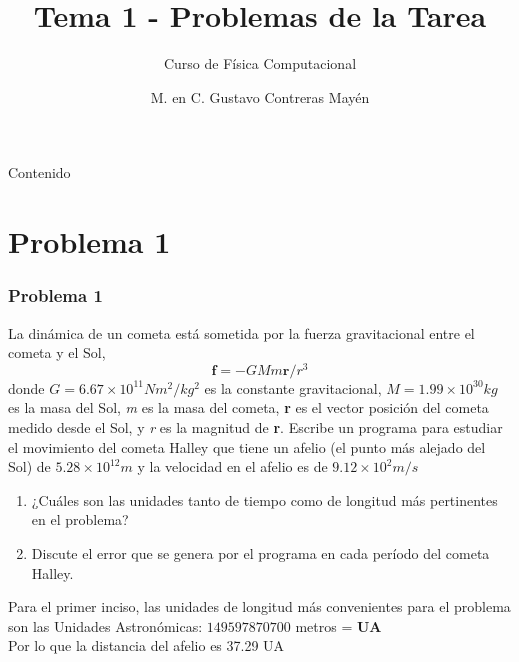 

\renewcommand {\arraystretch}{1.5}
{
}
\title{Tema 1 - Problemas de la Tarea}
\subtitle{Curso de F\'{i}sica Computacional}
\author{M. en C. Gustavo Contreras May\'{e}n}

\maketitle
\fontsize{14}{14}\selectfont
{}
\begin{frame}{Contenido}
\tableofcontents[pausesections]
\end{frame}
\section{Problema 1}
\begin{frame}
\frametitle{Problema 1}
La din\'{a}mica de un cometa est\'{a} sometida por la fuerza gravitacional entre el cometa y el Sol, 
\[   \textbf{f} = -GMm \textbf{r}/r^{3} \]
donde $ G=6.67 \times 10^{11} Nm^{2}/kg^{2}$ es la constante gravitacional, $M=1.99 \times 10^{30} kg$ es la masa del Sol, \textit{m} es la masa del cometa, \textbf{r} es el vector posici\'{o}n del cometa medido desde el Sol, y \textit{r} es la magnitud de \textbf{r}. Escribe un programa para estudiar el movimiento del cometa Halley que tiene un afelio (el punto m\'{a}s alejado del Sol) de $5.28 \times 10^{12}m$ y la velocidad en el afelio es de $9.12 \times 10^{2} m/s$
\end{frame}
\begin{frame}
\begin{enumerate}
\item ¿Cu\'{a}les son las unidades tanto de tiempo como de longitud m\'{a}s pertinentes en el problema?
\item Discute el error que se genera por el programa en cada per\'{i}odo del cometa Halley.
\end{enumerate}
\end{frame}
\begin{frame}
Para el primer inciso, las unidades de longitud m\'{a}s convenientes para el problema son las Unidades Astron\'{o}micas: $149597870700$ metros = \textbf{UA}
\\
\medskip
Por lo que la distancia del afelio es 37.29 UA
\end{frame}

